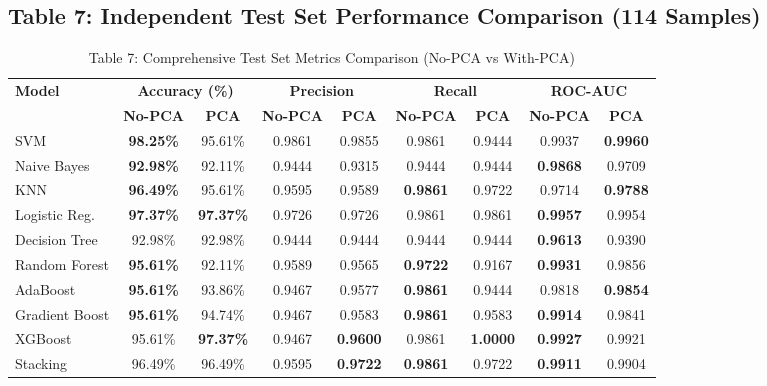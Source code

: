 \documentclass[12pt,a4paper]{article}
\begin{document}
\subsection*{Table 7: Independent Test Set Performance Comparison (114 Samples)}
\begin{table}[H]
\centering
\small
\begin{tabular}{|l|cc|cc|cc|cc|}
\hline
\multirow{2}{*}{\textbf{Model}} & \multicolumn{2}{c|}{\textbf{Accuracy (\%)}} & \multicolumn{2}{c|}{\textbf{Precision}} & \multicolumn{2}{c|}{\textbf{Recall}} & \multicolumn{2}{c|}{\textbf{ROC-AUC}} \\ \cline{2-9}
& \textbf{No-PCA} & \textbf{PCA} & \textbf{No-PCA} & \textbf{PCA} & \textbf{No-PCA} & \textbf{PCA} & \textbf{No-PCA} & \textbf{PCA} \\ \hline
SVM & \textbf{98.25\%} & 95.61\% & 0.9861 & 0.9855 & 0.9861 & 0.9444 & 0.9937 & \textbf{0.9960} \\ \hline
Naive Bayes & \textbf{92.98\%} & 92.11\% & 0.9444 & 0.9315 & 0.9444 & 0.9444 & \textbf{0.9868} & 0.9709 \\ \hline
KNN & \textbf{96.49\%} & 95.61\% & 0.9595 & 0.9589 & \textbf{0.9861} & 0.9722 & 0.9714 & \textbf{0.9788} \\ \hline
Logistic Reg. & \textbf{97.37\%} & \textbf{97.37\%} & 0.9726 & 0.9726 & 0.9861 & 0.9861 & \textbf{0.9957} & 0.9954 \\ \hline
Decision Tree & 92.98\% & 92.98\% & 0.9444 & 0.9444 & 0.9444 & 0.9444 & \textbf{0.9613} & 0.9390 \\ \hline
Random Forest & \textbf{95.61\%} & 92.11\% & 0.9589 & 0.9565 & \textbf{0.9722} & 0.9167 & \textbf{0.9931} & 0.9856 \\ \hline
AdaBoost & \textbf{95.61\%} & 93.86\% & 0.9467 & 0.9577 & \textbf{0.9861} & 0.9444 & 0.9818 & \textbf{0.9854} \\ \hline
Gradient Boost & \textbf{95.61\%} & 94.74\% & 0.9467 & 0.9583 & \textbf{0.9861} & 0.9583 & \textbf{0.9914} & 0.9841 \\ \hline
XGBoost & 95.61\% & \textbf{97.37\%} & 0.9467 & \textbf{0.9600} & 0.9861 & \textbf{1.0000} & \textbf{0.9927} & 0.9921 \\ \hline
Stacking & 96.49\% & 96.49\% & 0.9595 & \textbf{0.9722} & \textbf{0.9861} & 0.9722 & \textbf{0.9911} & 0.9904 \\ \hline
\end{tabular}
\caption{Table 7: Comprehensive Test Set Metrics Comparison (No-PCA vs With-PCA)}
\label{tab:exp7_test_metrics}
\end{table}
\end{document}
